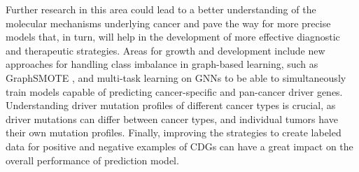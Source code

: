 Further research in this area could lead to a better understanding of the molecular mechanisms underlying cancer and pave the way for more precise models that, in turn, will help in the development of more effective diagnostic and therapeutic strategies. Areas for growth and development include new approaches for handling class imbalance in graph-based learning, such as GraphSMOTE \cite{zhao2021graphsmote}, and multi-task learning on GNNs to be able to simultaneously train models capable of predicting cancer-specific and pan-cancer driver genes. Understanding driver mutation profiles of different cancer types is crucial, as driver mutations can differ between cancer types, and individual tumors have their own mutation profiles. Finally, improving the strategies to create labeled data for positive and negative examples of CDGs can have a great impact on the overall performance of prediction model. 


